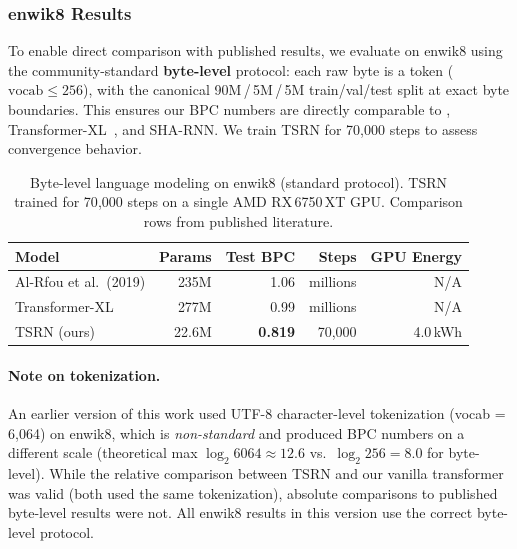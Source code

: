 \documentclass[11pt,a4paper]{article}
\begin{document}
\subsubsection{enwik8 Results}
\label{sec:enwik8_results}

To enable direct comparison with published results, we evaluate on
enwik8 using the community-standard \textbf{byte-level} protocol:
each raw byte is a token ($\text{vocab} \leq 256$), with the
canonical 90M\,/\,5M\,/\,5M train/val/test split at exact byte
boundaries.  This ensures our BPC numbers are directly comparable to
\citet{al2019character}, Transformer-XL~\citep{dai2019transformerxl},
and SHA-RNN.  We train TSRN for 70{,}000 steps to assess convergence
behavior.

\begin{table}[t]
\centering
\caption{Byte-level language modeling on enwik8 (standard protocol).
  TSRN trained for 70{,}000 steps on a single AMD RX\,6750\,XT GPU.
  Comparison rows from published literature.}
\label{tab:enwik8}
\begin{tabular}{lrrrr}
\toprule
\textbf{Model} & \textbf{Params} & \textbf{Test BPC} &
  \textbf{Steps} & \textbf{GPU Energy} \\
\midrule
Al-Rfou et al.\ (2019) & 235M & 1.06 & millions & N/A \\
Transformer-XL          & 277M & 0.99 & millions & N/A \\
\midrule
TSRN (ours)             & 22.6M &
  \textbf{0.819} & 70{,}000 & 4.0\,kWh \\
\bottomrule
\end{tabular}
\end{table}

\paragraph{Note on tokenization.}
An earlier version of this work used UTF-8 character-level tokenization
(vocab = 6{,}064) on enwik8, which is \emph{non-standard} and produced
BPC numbers on a different scale (theoretical max $\log_2 6064 \approx
12.6$ vs.\ $\log_2 256 = 8.0$ for byte-level).  While the relative
comparison between TSRN and our vanilla transformer was valid (both
used the same tokenization), absolute comparisons to published
byte-level results were not.  All enwik8 results in this version use
the correct byte-level protocol.
\end{document}
